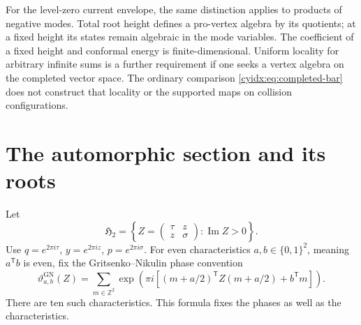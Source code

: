 For the level-zero current envelope, the same distinction
applies to products of negative modes. Total root height
defines a pro-vertex algebra by its quotients; at a fixed
height its states remain algebraic in the mode variables.
The coefficient of a fixed height and conformal energy
is finite-dimensional. Uniform locality for arbitrary
infinite sums is a further requirement if one seeks a
vertex algebra on the completed vector space.
The ordinary comparison \eqref{cyidx:eq:completed-bar}
does not construct that locality or the supported maps
on collision configurations.

\section{The automorphic section and its roots}
\label{cyidx:sec:automorphic-line}

Let
\[
 \mathfrak H_2=
 \left\{Z=\begin{pmatrix}\tau&z\\z&\sigma\end{pmatrix}
                  :\operatorname{Im}Z>0\right\}.
\]
Use \(q=e^{2\pi i\tau}\), \(y=e^{2\pi iz}\),
\(p=e^{2\pi i\sigma}\). For even characteristics
\(a,b\in\{0,1\}^2\), meaning \(a^{\mathsf T}b\) is even,
fix the Gritsenko--Nikulin phase convention
\begin{equation}\label{cyidx:eq:theta-phase}
 \vartheta^{\mathrm{GN}}_{a,b}(Z)=
 \sum_{m\in\mathbb Z^2}
  \exp\!\left(\pi i\left[
    (m+a/2)^{\mathsf T}Z(m+a/2)+b^{\mathsf T}m\right]\right).
\end{equation}
There are ten such characteristics.
This formula fixes the phases as well as the characteristics.

